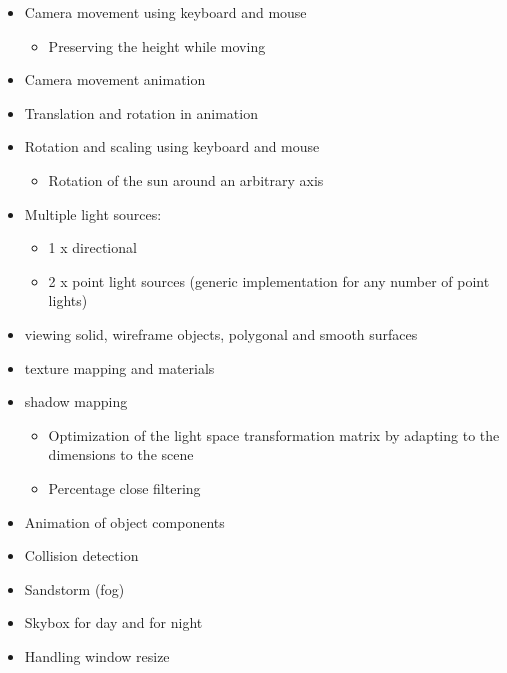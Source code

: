 \begin{itemize}

\item Camera movement using keyboard and mouse

\begin{itemize}
 \item Preserving the height while moving
\end{itemize}

\item Camera movement animation

\item Translation and rotation in animation

\item Rotation and scaling using keyboard and mouse

\begin{itemize}
 \item Rotation of the sun around an arbitrary axis
\end{itemize}

\item Multiple light sources:

\begin{itemize}
 \item 1 x directional
 \item 2 x point light sources (generic implementation for any number of point lights)
\end{itemize}

\item viewing solid, wireframe objects, polygonal and smooth surfaces

\item texture mapping and materials

\item shadow mapping

\begin{itemize}
 \item Optimization of the light space transformation matrix by adapting to the dimensions to the scene
 
 \item Percentage close filtering
\end{itemize}

\item Animation of object components

\item Collision detection

\item Sandstorm (fog)

\item Skybox for day and for night

\item Handling window resize

\end{itemize}
